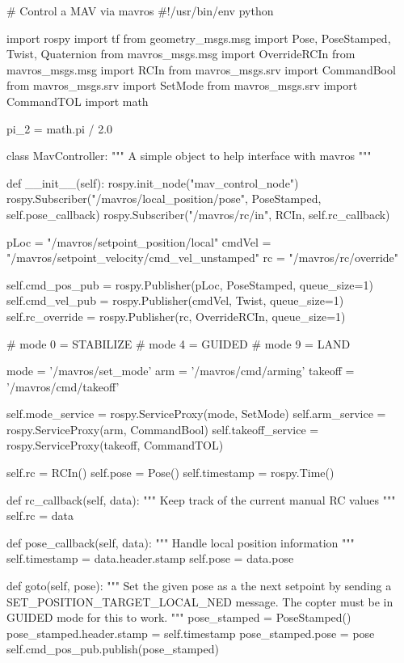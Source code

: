 \documentclass[a4paper,12pt]{article}
\begin{document}
\begin{MyCode}

# Control a MAV via mavros
#!/usr/bin/env python

import rospy
import tf
from geometry_msgs.msg import Pose, PoseStamped, Twist, Quaternion
from mavros_msgs.msg import OverrideRCIn
from mavros_msgs.msg import RCIn
from mavros_msgs.srv import CommandBool
from mavros_msgs.srv import SetMode
from mavros_msgs.srv import CommandTOL
import math

pi_2 = math.pi / 2.0

class MavController:
	"""
	A simple object to help interface with mavros
	"""
	
	def __init__(self):
		rospy.init_node("mav_control_node")
		rospy.Subscriber("/mavros/local_position/pose",
				 PoseStamped, self.pose_callback)
		rospy.Subscriber("/mavros/rc/in", RCIn,
				 self.rc_callback)
		
		pLoc = "/mavros/setpoint_position/local"
		cmdVel = "/mavros/setpoint_velocity/cmd_vel_unstamped"
		rc = "/mavros/rc/override"
		
		self.cmd_pos_pub = rospy.Publisher(pLoc, PoseStamped,
				 		  queue_size=1)
		self.cmd_vel_pub = rospy.Publisher(cmdVel, Twist,
						   queue_size=1)
		self.rc_override = rospy.Publisher(rc, OverrideRCIn,
						   queue_size=1)
		
		# mode 0 = STABILIZE
		# mode 4 = GUIDED
		# mode 9 = LAND
		
		mode = '/mavros/set_mode'
		arm = '/mavros/cmd/arming'
		takeoff = '/mavros/cmd/takeoff'
		
		self.mode_service = rospy.ServiceProxy(mode, SetMode)
		self.arm_service = rospy.ServiceProxy(arm,
						      CommandBool)
		self.takeoff_service = rospy.ServiceProxy(takeoff,
						          CommandTOL)
		
		self.rc = RCIn()
		self.pose = Pose()
		self.timestamp = rospy.Time()
		
	def rc_callback(self, data):
		"""
		Keep track of the current manual RC values
		"""
		self.rc = data
		
	def pose_callback(self, data):
		"""
		Handle local position information
		"""
		self.timestamp = data.header.stamp
		self.pose = data.pose
		
	def goto(self, pose):
		"""
		Set the given pose as a the next setpoint by sending
		a SET_POSITION_TARGET_LOCAL_NED message.
		The copter must be in GUIDED mode for this to work.
		"""
		pose_stamped = PoseStamped()
		pose_stamped.header.stamp = self.timestamp
		pose_stamped.pose = pose
		self.cmd_pos_pub.publish(pose_stamped)
		

\end{MyCode}
\end{document}

